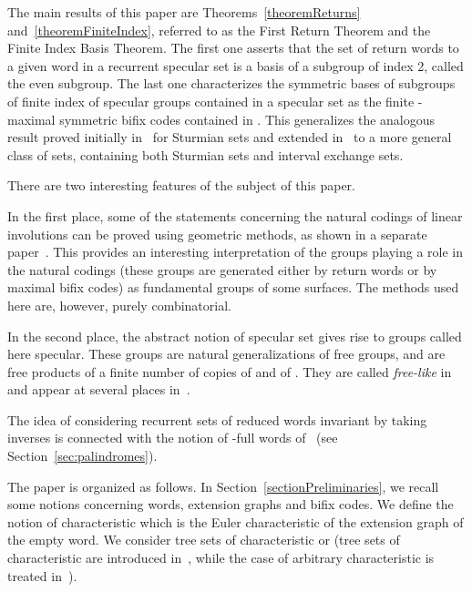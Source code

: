 \documentclass[preprint,12pt]{elsarticle}
\numberwithin{theorem}{section}
\numberwithin{equation}{section}
\numberwithin{figure}{section}
\numberwithin{table}{section}
\begin{document}
The main results of this paper are Theorems~\ref{theoremReturns} and~\ref{theoremFiniteIndex}, referred to as the First Return Theorem and the Finite Index Basis Theorem.
The first one asserts that the set of return words to a given word in a recurrent specular set is a basis of a subgroup of index 2, called the even subgroup.
The last one characterizes the symmetric bases of subgroups of finite index of specular groups contained in a specular set  as the finite -maximal symmetric bifix codes contained in . This generalizes the analogous result proved initially in~\cite{BerstelDeFelicePerrinReutenauerRindone2012} for Sturmian sets and extended in~\cite{BertheDeFeliceDolceLeroyPerrinReutenauerRindone2013b} to a more general class of sets, containing both Sturmian sets and interval exchange sets.

There are two interesting features of the subject of this paper.

In the first place, some of the statements concerning the natural codings of linear involutions can be proved using geometric methods, as shown in a separate paper~\cite{BertheDelecroixDolcePerrinReutenauerRindone2014}.
This provides an interesting interpretation of the groups playing a role in the natural codings (these groups are generated either by return words or by maximal bifix codes) as fundamental groups of some surfaces.
The methods used here are, however, purely combinatorial.

In the second place, the abstract notion of specular set gives rise to groups called here specular.
These groups are natural generalizations of free groups, and are free products of a finite number of copies of  and of .
They are called \emph{free-like} in~\cite{Bartholdi2014} and appear at several places in~\cite{Harpe2000}.

The idea of considering recurrent sets of reduced words invariant by taking inverses is connected with the notion of -full words of~\cite{PelantovaStarosta2014} (see Section~\ref{sec:palindromes}).

The paper is organized as follows.
In Section~\ref{sectionPreliminaries}, we recall some notions concerning words, extension graphs and bifix codes.
We define the notion of characteristic which is the Euler characteristic of the extension graph of the empty word.
We consider tree sets of characteristic  or  (tree sets of characteristic  are introduced in~\cite{BertheDeFeliceDolceLeroyPerrinReutenauerRindone2013a}, while the case of arbitrary characteristic is treated in~\cite{DolcePerrin2016}).
\end{document}
